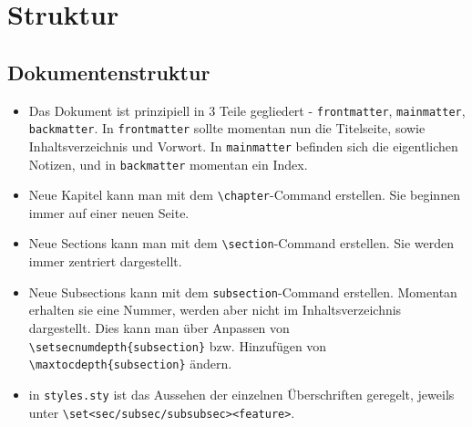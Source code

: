 \documentclass[11pt,twoside]{memoir}
\begin{document}
	
\frontmatter
\maketitle
\tableofcontents

\mainmatter
\chapter{Struktur}
\section{Dokumentenstruktur}
\begin{itemize}
\item Das Dokument ist prinzipiell in 3 Teile gegliedert - \verb|frontmatter|, \verb|mainmatter|, \verb|backmatter|. In \verb|frontmatter| sollte momentan nun die Titelseite, sowie Inhaltsverzeichnis und Vorwort. In \verb|mainmatter| befinden sich die eigentlichen Notizen, und in \verb|backmatter| momentan ein Index.
\item Neue Kapitel kann man mit dem \verb|\chapter|-Command erstellen. Sie beginnen immer auf einer neuen Seite.
\item Neue Sections kann man mit dem \verb|\section|-Command erstellen. Sie werden immer zentriert dargestellt.
\item Neue Subsections kann mit dem \verb|subsection|-Command erstellen. Momentan erhalten sie eine Nummer, werden aber nicht im Inhaltsverzeichnis dargestellt. Dies kann man über Anpassen von \verb|\setsecnumdepth{subsection}| bzw. Hinzufügen von \verb|\maxtocdepth{subsection}| ändern.
\item in \verb|styles.sty| ist das Aussehen der einzelnen Überschriften geregelt, jeweils unter \verb|\set<sec/subsec/subsubsec><feature>|.
\end{itemize}
\lec


\backmatter
\printindex
\end{document}
